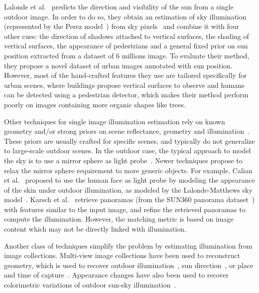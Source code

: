 Lalonde et al.~\cite{lalonde-ijcv-12} predicts the direction and visibility of the sun from a single outdoor image. In order to do so, they obtain an estimation of sky illumination (represented by the Perez model~\cite{perez1993allweather}) from sky pixels~\cite{lalonde-ijcv-10} and combine it with four other cues: the direction of shadows attached to vertical surfaces, the shading of vertical surfaces, the appearance of pedestrians and a general fixed prior on sun position extracted from a dataset of 6 millions image. To evaluate their method, they propose a novel dataset of urban images annotated with sun position. However, most of the hand-crafted features they use are tailored specifically for urban scenes, where buildings propose vertical surfaces to observe and humans can be detected using a pedestrian detector, which makes their method perform poorly on images containing more organic shapes like trees. 

Other techniques for single image illumination estimation rely on known geometry and/or strong priors on scene reflectance, geometry and illumination~\cite{barron-pami-15,barron2013rgbd,lombardi2016reflectance}. These priors are usually crafted for specific scenes, and typically do not generalize to large-scale outdoor scenes. In the outdoor case, the typical approach to model the sky is to use a mirror sphere as light probe~\cite{debevec-siggraph-98}. Newer techniques propose to relax the mirror sphere requirement to more generic objects. For example, Calian et al.~\cite{calian2018face} proposed to use the human face as light probe by modeling the appearance of the skin under outdoor illumination, as modeled by the Lalonde-Matthews sky model~\cite{lalonde-3dv-14}. Karsch et al.~\cite{karsch2014automatic} retrieve panoramas (from the SUN360 panorama dataset~\cite{xiao-cvpr-12}) with features similar to the input image, and refine the retrieved panoramas to compute the illumination. However, the matching metric is based on image content which may not be directly linked with illumination. 

Another class of techniques simplify the problem by estimating illumination from image collections. Multi-view image collections have been used to reconstruct geometry, which is used to recover outdoor illumination~\cite{haber2009relighting,lalonde-3dv-14,shan2015visual,duchene2015multiview}, sun direction~\cite{wehrwein2015shadows}, or place and time of capture~\cite{hauagge2014outdoor}. Appearance changes have also been used to recover colorimetric variations of outdoor sun-sky illumination~\cite{sunkavalli2008color}. 


